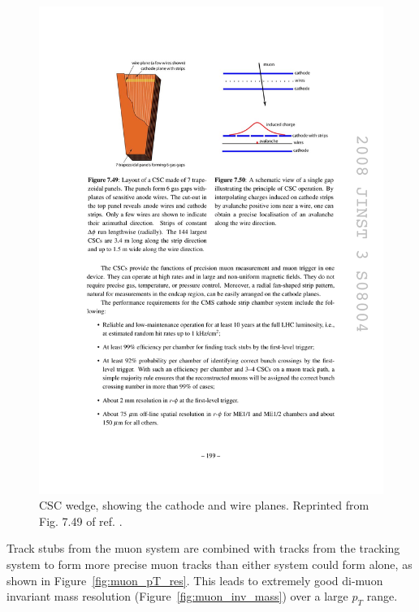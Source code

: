 \documentclass[dissertation.tex]{subfiles}
\begin{document}
\begin{figure}
	\centering
	\includegraphics[scale=1.0]{muons_CSC_wedge}
	\caption{CSC wedge, showing the cathode and wire planes.  Reprinted from Fig. 7.49 of ref. \cite{CMS_detector_paper}.}
	\label{fig:muons_CSC_wedge}
\end{figure}

Track stubs from the muon system are combined with tracks from the tracking system to form more precise muon tracks than either system could form alone, as shown in Figure~\ref{fig:muon_pT_res}.  This leads to extremely good di-muon invariant mass resolution (Figure~\ref{fig:muon_inv_mass}) over a large $p_{T}$ range.
\end{document}
